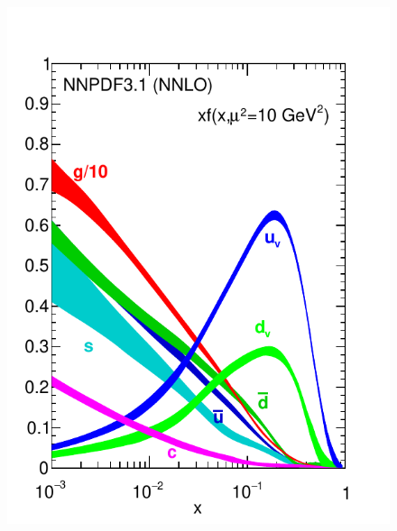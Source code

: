 \begin{figure}[t]
\begin{center}
  \includegraphics[scale=0.75]{plots/nnpdf31nnlo-10.pdf}

\end{center}
\end{figure}
